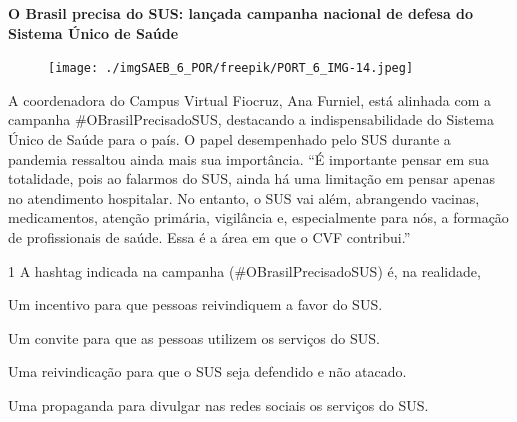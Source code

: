 \begin{myquote}
\begin{center}
\textbf{O Brasil precisa do SUS: lançada campanha nacional de defesa do
Sistema Único de Saúde}
\end{center}

\begin{figure}[H]
\centering\texttt{[image: ./imgSAEB\_6\_POR/freepik/PORT\_6\_IMG-14.jpeg]}
\end{figure}
A coordenadora do Campus Virtual Fiocruz, Ana Furniel, está alinhada com
a campanha \#OBrasilPrecisadoSUS, destacando a indispensabilidade do
Sistema Único de Saúde para o país. O papel desempenhado pelo SUS
durante a pandemia ressaltou ainda mais sua importância. ``É importante
pensar em sua totalidade, pois ao falarmos do SUS, ainda há uma
limitação em pensar apenas no atendimento hospitalar. No entanto, o SUS
vai além, abrangendo vacinas, medicamentos, atenção primária, vigilância
e, especialmente para nós, a formação de profissionais de saúde. Essa é
a área em que o CVF contribui.''

\end{myquote}

\num{1} A hashtag indicada na campanha (\#OBrasilPrecisadoSUS) é, na realidade,

\begin{escolha}
\item Um incentivo para que pessoas reivindiquem a favor do SUS.
\item Um convite para que as pessoas utilizem os serviços do SUS.
\item Uma reivindicação para que o SUS seja defendido e não atacado.
\item Uma propaganda para divulgar nas redes sociais os serviços do SUS.
\end{escolha}


